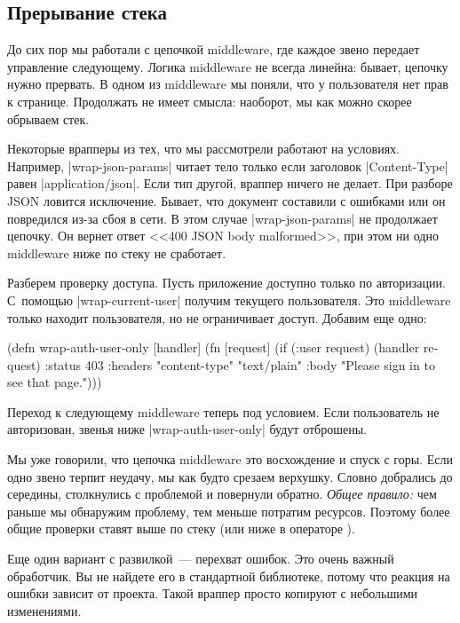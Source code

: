 \subsection{Прерывание стека}

До сих пор мы работали с цепочкой middleware, где каждое звено передает
управление следующему. Логика middleware не всегда линейна: бывает, цепочку
нужно прервать. В одном из middleware мы поняли, что у пользователя нет прав к
странице. Продолжать не имеет смысла: наоборот, мы как можно скорее обрываем
стек.

Некоторые врапперы из тех, что мы рассмотрели работают на условиях. Например,
\spverb|wrap-json-params| читает тело только если заголовок
\spverb|Content-Type| равен \spverb|application/json|. Если тип другой, враппер
ничего не делает. При разборе JSON ловится исключение. Бывает, что документ
составили с ошибками или он повредился из-за сбоя в сети. В этом случае
\spverb|wrap-json-params| не продолжает цепочку. Он вернет ответ <<400 JSON body
malformed>>, при этом ни одно middleware ниже по стеку не сработает.

Разберем проверку доступа. Пусть приложение доступно только по
авторизации. С~помощью \spverb|wrap-current-user| получим текущего
пользователя. Это middleware только находит пользователя, но не ограничивает
доступ. Добавим еще одно:

\begin{english}
  \begin{clojure}
(defn wrap-auth-user-only [handler]
  (fn [request]
    (if (:user request)
      (handler request)
      {:status 403
       :headers {"content-type" "text/plain"}
       :body "Please sign in to see that page."})))
  \end{clojure}
\end{english}

Переход к следующему middleware теперь под условием. Если пользователь не
авторизован, звенья ниже \spverb|wrap-auth-user-only| будут отброшены.

Мы уже говорили, что цепочка middleware это восхождение и спуск с горы. Если
одно звено терпит неудачу, мы как будто срезаем верхушку. Словно добрались до
середины, столкнулись с проблемой и повернули обратно. \emph{Общее правило:} чем
раньше мы обнаружим проблему, тем меньше потратим ресурсов. Поэтому более общие
проверки ставят выше по стеку (или ниже в операторе \arr).

Еще один вариант с развилкой~--- перехват ошибок. Это очень важный
обработчик. Вы не найдете его в стандартной библиотеке, потому что реакция на
ошибки зависит от проекта. Такой враппер просто копируют с небольшими
изменениями.


